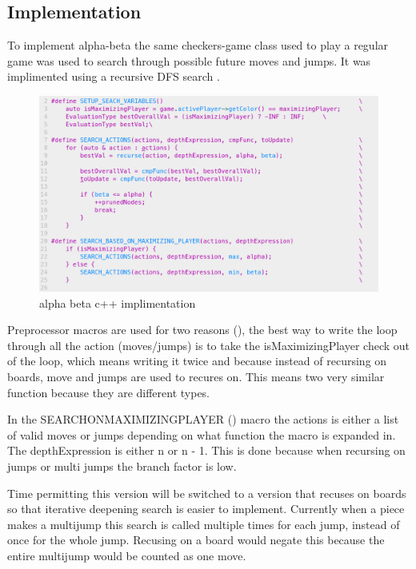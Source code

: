 \documentclass{article}
\begin{document}
\subsection{Implementation}

To implement alpha-beta the same checkers-game class used to play a regular
game was used to search through possible future moves and jumps. It was implimented
using a recursive DFS search .

\begin{figure}
    \includegraphics[width=\linewidth]{images/alpha-beta-code.png}
    \caption{alpha beta c++ implimentation}
    \label{fig:ab-code}
\end{figure}

Preprocessor macros are used for two reasons (), the best way to write the loop
through all the action (moves/jumps) is to take the isMaximizingPlayer check
out of the loop, which means writing it twice and because instead of recursing
on boards, move and jumps are used to recures on. This means two very similar
function because they are different types.

In the SEARCH\textunderscore{}ON\textunderscore{}MAXIMIZING\textunderscore{}PLAYER ()
macro the actions is either a list of valid
moves or jumps depending on what function the macro is expanded in. The
depthExpression is either n or n - 1. This is done because when recursing on
jumps or multi jumps the branch factor is low.

Time permitting this version
will be switched to a version that recuses on boards so that iterative
deepening search is easier to implement. Currently when a piece makes a
multijump this search is called multiple times for each jump, instead of once
for the whole jump. Recusing on a board would negate this because the entire
multijump would be counted as one move.
\end{document}
